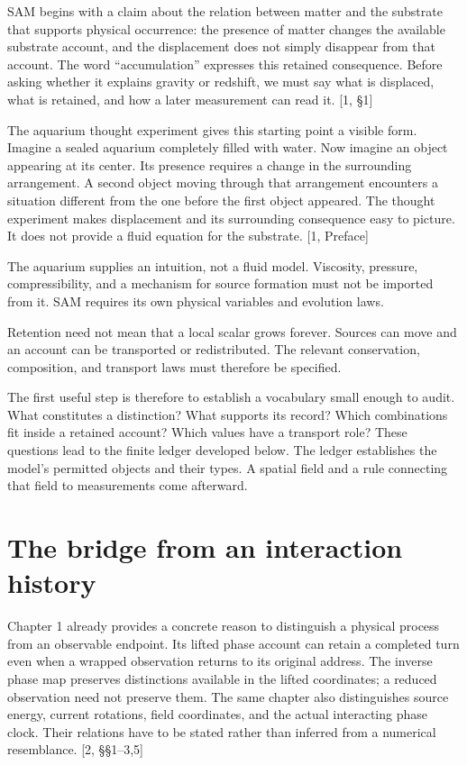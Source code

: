 \documentclass[10pt,twocolumn,letterpaper]{article}
\begin{document}
SAM begins with a claim about the relation between matter and the substrate that supports physical occurrence: the presence of matter changes the available substrate account, and the displacement does not simply disappear from that account. The word ``accumulation'' expresses this retained consequence. Before asking whether it explains gravity or redshift, we must say what is displaced, what is retained, and how a later measurement can read it. {[}1, §1{]}

The aquarium thought experiment gives this starting point a visible form. Imagine a sealed aquarium completely filled with water. Now imagine an object appearing at its center. Its presence requires a change in the surrounding arrangement. A second object moving through that arrangement encounters a situation different from the one before the first object appeared. The thought experiment makes displacement and its surrounding consequence easy to picture. It does not provide a fluid equation for the substrate. {[}1, Preface{]}

The aquarium supplies an intuition, not a fluid model. Viscosity, pressure, compressibility, and a mechanism for source formation must not be imported from it. SAM requires its own physical variables and evolution laws.

Retention need not mean that a local scalar grows forever. Sources can move and an account can be transported or redistributed. The relevant conservation, composition, and transport laws must therefore be specified.

The first useful step is therefore to establish a vocabulary small enough to audit. What constitutes a distinction? What supports its record? Which combinations fit inside a retained account? Which values have a transport role? These questions lead to the finite ledger developed below. The ledger establishes the model's permitted objects and their types. A spatial field and a rule connecting that field to measurements come afterward.

\section{The bridge from an interaction history}\label{the-bridge-from-an-interaction-history}

Chapter 1 already provides a concrete reason to distinguish a physical process from an observable endpoint. Its lifted phase account can retain a completed turn even when a wrapped observation returns to its original address. The inverse phase map preserves distinctions available in the lifted coordinates; a reduced observation need not preserve them. The same chapter also distinguishes source energy, current rotations, field coordinates, and the actual interacting phase clock. Their relations have to be stated rather than inferred from a numerical resemblance. {[}2, §§1--3,5{]}
\end{document}
